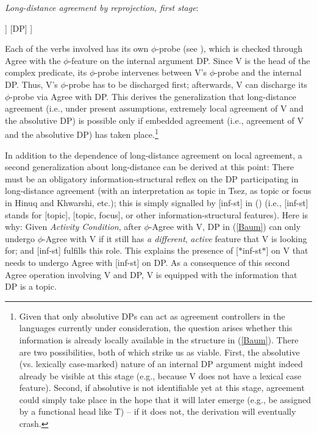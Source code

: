 \documentclass[output=paper
,modfonts
,nonflat]{langsci/langscibook}
\begin{document}
	\begin{exe}
		\ex	\label{ex:mueller:32} {\textit{Long-distance agreement by reprojection, first stage}\label{Baum}}:\\
			\begin{forest}	
				[VP
				[V\sub{2}
				[V\sub{1{,}{[}•C•{]}{,}{[}$\ast$$\phi$$\ast${]}{,}{[}\textit{$\ast$inf--st$\ast$}{]}} ]
				[V\sub{2{,}\underline{{[}$\ast$$\phi$$\ast${]}}}] ]
				[DP]
				] 	
		\end{forest}
	\end{exe} 
	\noindent	Each of the verbs involved has its own $\phi$-probe
	(see \citealt{BejarRezac:09}), which is checked through Agree with the
	$\phi$-feature on the internal argument DP. Since V is the head of
	the complex predicate, its $\phi$-probe intervenes between V's
	$\phi$-probe and the internal DP.  Thus, V's $\phi$-probe has to be
	discharged first; afterwards, V can discharge its  $\phi$-probe via
	Agree with DP. This
	derives the generalization that long-distance agreement (i.e., under
	present assumptions, extremely local agreement of V and the absolutive DP)
	is possible only if embedded agreement (i.e., agreement of V and the
	absolutive DP) has taken place.\footnote{Given that only absolutive
		DPs can act as agreement controllers in the languages currently
		under consideration, the question arises whether this information is
		already locally available in the structure in (\ref{Baum}). There are
		two possibilities, both of which strike us as viable. First, the
		absolutive (vs. lexically case-marked) nature of an internal DP
		argument might indeed already be visible at this stage (e.g.,
		because V does not have a lexical case feature). Second, if
		absolutive is not identifiable yet at this stage, agreement could
		simply take place in the hope that it will later emerge (e.g., be
		assigned by a functional head like T) -- if it does not, the
		derivation will eventually crash.}
	
	In addition to the dependence of long-distance agreement on local
	agreement, a second generalization about long-distance can be derived
	at this point: There must be an obligatory information-structural
	reflex on the DP participating in long-distance agreement (with an
	interpretation as topic in Tsez, as topic or focus in Hinuq and
	Khwarshi, etc.); this is simply signalled by [inf-st] in (\Last) (i.e.,
	[inf-st] stands for [topic], [topic, focus], or other
	information-structural features). Here is why: 
	Given   {\itshape Activity Condition}, after $\phi$-Agree
	with V, DP in (\ref{Baum}) can only undergo $\phi$-Agree
	with V if it still has {\itshape a different}, {\itshape active} feature
	that V is looking for; and [inf-st] fulfills this role.
	This explains the presence of [$\ast$inf-st$\ast$] on V that needs to undergo
	Agree with [inf-st] on  DP. As a consequence of this second
	Agree operation involving V and DP, V is equipped with the
	information that DP is a topic. 
	
\end{document}
